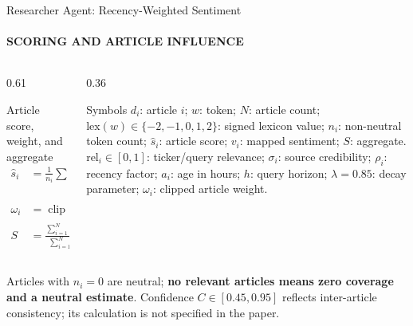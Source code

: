\documentclass[aspectratio=169,11pt]{beamer}
\newcommand{\keyphrase}[1]{\textbf{\color{DELCONred}#1}}
\begin{document}
\begin{frame}{Researcher Agent: Recency-Weighted Sentiment}
  \framesubtitle{SCORING AND ARTICLE INFLUENCE}
  \begin{columns}[T,onlytextwidth]
    \begin{column}{0.61\textwidth}
      \begin{block}{Article score, weight, and aggregate}
        \scriptsize
        \begin{align*}
          \hat{s}_i &= \frac{1}{n_i}\sum_{\substack{w\in d_i\\\mathrm{lex}(w)\ne0}}\mathrm{lex}(w),\qquad
          n_i=\left|\{w\in d_i:\mathrm{lex}(w)\ne0\}\right|,\\[0.12em]
          \omega_i &= \operatorname{clip}(\mathrm{rel}_i\rho_i\sigma_i,\,0.1,\,2.2),\qquad
          \rho_i\propto\lambda^{a_i/h},\\[0.12em]
          S &= \frac{\sum_{i=1}^{N}v_i\omega_i}{\sum_{i=1}^{N}\omega_i}\in[-2,2].
        \end{align*}
      \end{block}
    \end{column}
    \begin{column}{0.36\textwidth}
      \begin{block}{Symbols}
        \scriptsize $d_i$: article $i$; $w$: token; $N$: article count; $\mathrm{lex}(w)\in\{-2,-1,0,1,2\}$: signed lexicon value; $n_i$: non-neutral token count; $\hat{s}_i$: article score; $v_i$: mapped sentiment; $S$: aggregate. $\mathrm{rel}_i\in[0,1]$: ticker/query relevance; $\sigma_i$: source credibility; $\rho_i$: recency factor; $a_i$: age in hours; $h$: query horizon; $\lambda=0.85$: decay parameter; $\omega_i$: clipped article weight.
      \end{block}
    \end{column}
  \end{columns}
  \vspace{0.06cm}
  {\scriptsize Articles with $n_i=0$ are neutral; \keyphrase{no relevant articles means zero coverage and a neutral estimate}. Confidence $C\in[0.45,0.95]$ reflects inter-article consistency; its calculation is not specified in the paper.}
\end{frame}
\end{document}
